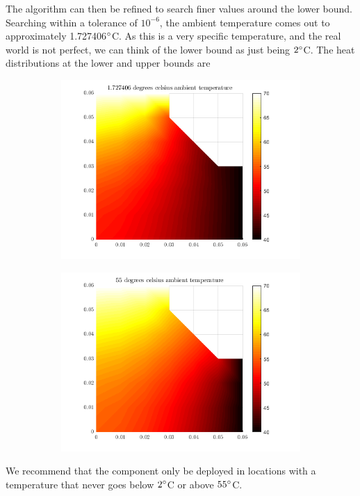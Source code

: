 \documentclass[12pt,a4paper]{article}
\begin{document}
The algorithm can then be refined to search finer values around the lower bound. Searching within a tolerance of $10^{-6}$, the ambient temperature comes out to approximately 1.727406$\degree$C. As this is a very specific temperature, and the real world is not perfect, we can think of the lower bound as just being $2\degree$C. The heat distributions at the lower and upper bounds are \begin{figure}[H]

	\begin{subfigure}[b]{0.49\textwidth}
		\hspace{-8mm}
		\includegraphics[width=\textwidth]{images/coldplate.png}
	\end{subfigure}
	\hspace{-8mm}
	\begin{subfigure}[b]{0.49\textwidth}
		\hspace{-8mm}
		\includegraphics[width=\textwidth]{images/hotplate.png}
	\end{subfigure}
\end{figure}
We recommend that the component only be deployed in locations with a temperature that never goes below $2\degree$C or above $55\degree$C.
\end{document}
